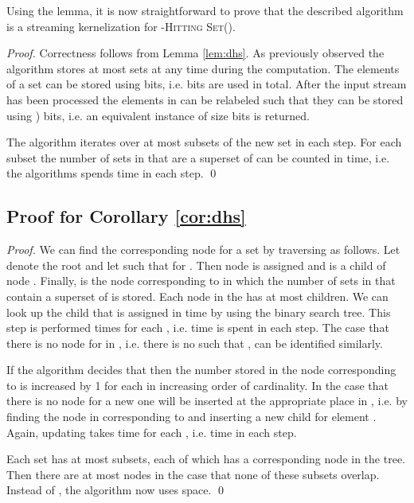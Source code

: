 \documentclass[draft,a4paper]{llncs}
\newcommand{\dHSk}{-\textsc{Hitting Set()}\xspace}
\begin{document}
Using the lemma, it is now straightforward to prove that the described algorithm is a streaming kernelization for \dHSk.

\begin{proof}
Correctness follows from Lemma \ref{lem:dhs}. As previously observed the algorithm stores at most  sets at any
time during the computation. The elements of a set can be stored using  bits, i.e.  bits are used in total.
After the input stream has been processed the elements in  can be relabeled such that they can be stored using ) bits, i.e. an equivalent instance of size  bits is returned.
 
The algorithm iterates over at most  subsets of the new set in each step. For each subset  the number of sets in  that are a superset of  can be counted in  time, i.e. the algorithms spends  time in each step. \qed
\end{proof}

\subsection{Proof for Corollary \ref{cor:dhs}}

\begin{proof}
 We can find the corresponding node for a set  by traversing  as follows. Let  denote the root and let 
 such that  for . Then node  is assigned  and is a 
child of node . Finally,  is the node corresponding to  in which the number of sets in  that contain a
superset of  is stored. Each node in the  has at most  children. We can look up the child that is 
assigned  in  time by using the binary search tree. This step is performed  times for each 
, i.e.  time is spent in each step. The case that there is no node for  in , i.e. there is no  such that , can be identified similarly.

If the algorithm decides that  then the number stored in the node corresponding to  is increased by 1 for 
each  in increasing order of cardinality. In the case that there is no node for  a new one will be
inserted at the appropriate place in , i.e. by finding the node in  corresponding to  and inserting a new child for element . Again, updating takes  time for each , i.e.  time in each step.

Each set  has at most  subsets, each of which has a corresponding node in the tree. Then there are at most
 nodes in the case that none of these subsets overlap. Instead of , the algorithm now uses  space. \qed
\end{proof}
\end{document}
